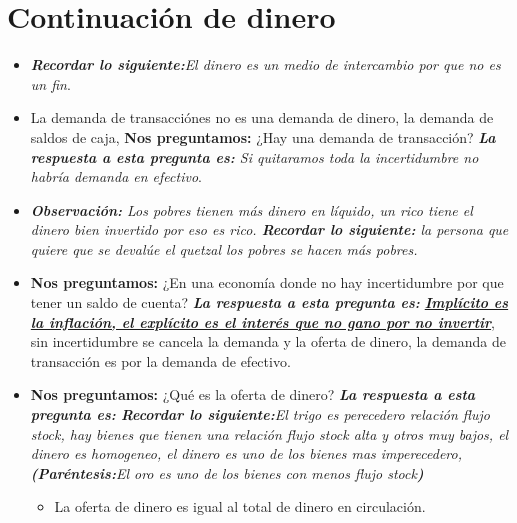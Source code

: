 \section{Continuación de dinero}
\begin{itemize}
    \item \emph{\textbf{Recordar lo siguiente:}El dinero es un medio de intercambio por que no es un fin}.
    \item La demanda de transacciónes no es una demanda de dinero, la demanda de saldos de caja, \textbf{Nos preguntamos:} ¿Hay una demanda de transacción? \emph{\textbf{La respuesta a esta pregunta es: }Si quitaramos toda la incertidumbre no habría demanda en efectivo}.
    \item \emph{\textbf{Observación: }Los pobres tienen más dinero en líquido, un rico tiene el dinero bien invertido por eso es rico. \emph{\textbf{Recordar lo siguiente:} la persona que quiere que se devalúe el quetzal los pobres se hacen más pobres.}}
    \item \textbf{Nos preguntamos:} ¿En una economía donde no hay incertidumbre por que tener un saldo de cuenta? \emph{\textbf{La respuesta a esta pregunta es: }\textbf{\underline{Implícito es la inflación, el explícito es el interés que no gano por no invertir}}}, sin incertidumbre se cancela la demanda y la oferta de dinero, la demanda de transacción es por la demanda de efectivo.
    \item \textbf{Nos preguntamos:} ¿Qué es la oferta de dinero? \emph{\textbf{La respuesta a esta pregunta es: }\emph{\textbf{Recordar lo siguiente:}El trigo es perecedero relación flujo stock, hay bienes que tienen una relación flujo stock alta y otros muy bajos}, el dinero es homogeneo, el dinero es uno de los bienes mas imperecedero, \emph{\textbf{(Paréntesis:}El oro es uno de los bienes con menos flujo stock\textbf{)}}}
        \begin{itemize}
            \item La oferta de dinero es igual al total de dinero en circulación.
        \end{itemize}
    

\end{itemize}
